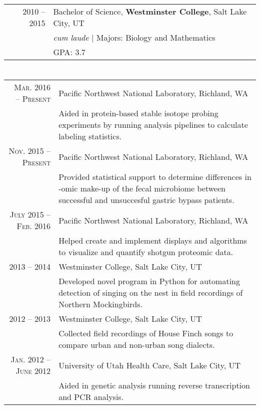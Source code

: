 \documentclass[a4paper,10pt]{article}
\begin{document}
\section{\color{linkcolour}{Education}}
\begin{tabular}{rl}
 \textsc{2010 -- 2015} & Bachelor of Science, \textbf{Westminster College}, Salt Lake City, UT\\
& \small\emph{cum laude} | Majors: Biology and Mathematics\\
&\normalsize \textsc{GPA}: 3.7
\end{tabular}

\section{\color{linkcolour}{Research}}
\begin{tabular}{rp{10cm}}
\textsc{Mar. 2016 -- Present} & Pacific Northwest National Laboratory, Richland, WA \\
& \footnotesize{Aided in protein-based stable isotope probing experiments by running analysis pipelines to  calculate labeling statistics.} \\
\textsc{Nov. 2015 -- Present} & Pacific Northwest National Laboratory, Richland, WA \\
& \footnotesize{Provided statistical support to determine differences in -omic make-up of the fecal microbiome between successful and unsuccesful gastric bypass patients.} \\
\textsc{July 2015 -- Feb. 2016} & Pacific Northwest National Laboratory, Richland, WA \\
& \footnotesize{Helped create and implement displays and algorithms to visualize and quantify shotgun proteomic data.} \\
 \textsc{2013 -- 2014} & Westminster College, Salt Lake City, UT\\
& \footnotesize{Developed novel program in Python for automating detection of singing on the nest in field recordings of Northern Mockingbirds.}\\
\textsc{2012 -- 2013} & Westminster College, Salt Lake City, UT\\
& \footnotesize{Collected field recordings of House Finch songs to compare urban and non-urban song dialects.}\\
\textsc{Jan. 2012 -- June 2012} & University of Utah Health Care, Salt Lake City, UT
\\& \footnotesize{Aided in genetic analysis running reverse transcription and PCR analysis.}
\end{tabular}
\end{document}

